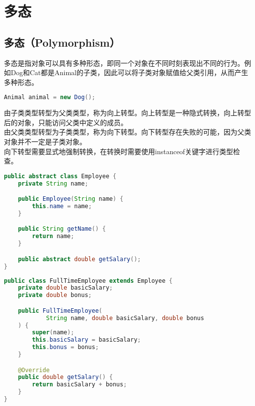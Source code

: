 \newpage

\section{多态}

\subsection{多态（Polymorphism）}

多态是指对象可以具有多种形态，即同一个对象在不同时刻表现出不同的行为。例如Dog和Cat都是Animal的子类，因此可以将子类对象赋值给父类引用，从而产生多种形态。

\vspace{-0.5cm}

\begin{lstlisting}[language=Java]
Animal animal = new Dog();
\end{lstlisting}

由子类类型转型为父类类型，称为向上转型。向上转型是一种隐式转换，向上转型后的对象，只能访问父类中定义的成员。\\

由父类类型转型为子类类型，称为向下转型。向下转型存在失败的可能，因为父类对象并不一定是子类对象。\\

向下转型需要显式地强制转换，在转换时需要使用instanceof关键字进行类型检查。\\


\begin{lstlisting}[language=Java]
public abstract class Employee {
    private String name;

    public Employee(String name) {
        this.name = name;
    }

    public String getName() {
        return name;
    }

    public abstract double getSalary();
}
\end{lstlisting}

\begin{lstlisting}[language=Java]
public class FullTimeEmployee extends Employee {
    private double basicSalary;
    private double bonus;

    public FullTimeEmployee(
            String name, double basicSalary, double bonus
    ) {
        super(name);
        this.basicSalary = basicSalary;
        this.bonus = bonus;
    }

    @Override
    public double getSalary() {
        return basicSalary + bonus;
    }
}
\end{lstlisting}

